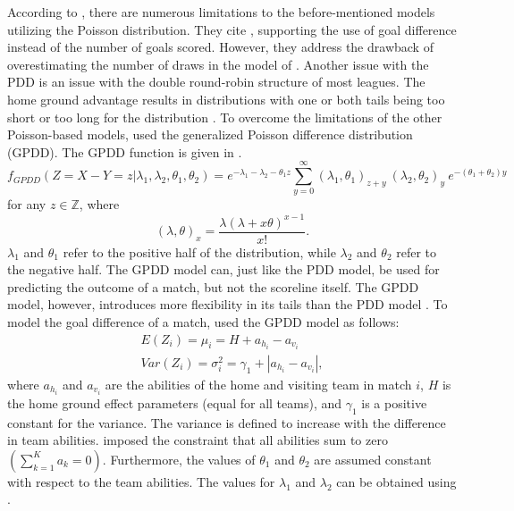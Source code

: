 According to \citet{bib:shahtahmassebi-moyeed-2016}, there are numerous limitations to the before-mentioned models utilizing the Poisson distribution. They cite \citet{bib:karlis-ntzoufras-2008}, supporting the use of goal difference instead of the number of goals scored. However, they address the drawback of overestimating the number of draws in the model of \citet{bib:karlis-ntzoufras-2008}. Another issue with the PDD is an issue with the double round-robin structure of most leagues. The home ground advantage results in distributions with one or both tails being too short or too long for the distribution \citep{bib:shahtahmassebi-moyeed-2016}. To overcome the limitations of the other Poisson-based models, \citet{bib:shahtahmassebi-moyeed-2016} used the generalized Poisson difference distribution (GPDD). The GPDD function is given in .
\begin{equation}
    f_{GPDD}(Z = X - Y = z | \lambda_{1}, \lambda_{2}, \theta_{1}, \theta_{2}) = e^{-\lambda_{1} - \lambda_{2} - \theta_{1} z} \sum_{y=0}^{\infty} (\lambda_{1}, \theta_{1})_{z + y}\ (\lambda_{2}, \theta_{2})_{y}\ e^{-(\theta_{1} + \theta_{2})y}
    \label{eq:gpdd-mass-function}
\end{equation}
for any $z \in \mathbb{Z}$, where
\begin{equation*}
    (\lambda, \theta)_{x} = \frac{\lambda(\lambda + x \theta)^{x - 1}}{x!}.
\end{equation*}
$\lambda_{1}$ and $\theta_{1}$ refer to the positive half of the distribution, while $\lambda_{2}$ and $\theta_{2}$ refer to the negative half. The GPDD model can, just like the PDD model, be used for predicting the outcome of a match, but not the scoreline itself. The GPDD model, however, introduces more flexibility in its tails than the PDD model \citep{bib:shahtahmassebi-moyeed-2016}. To model the goal difference of a match, \citet{bib:shahtahmassebi-moyeed-2016} used the GPDD model as follows:
\begin{equation*}
    \begin{aligned}
        E(Z_{i}) = \mu_{i} = H + a_{h_{i}} - a_{v_{i}} \\
        Var(Z_{i}) = \sigma_{i}^{2} = \gamma_{1} + | a_{h_{i}} - a_{v_{i}} |,
    \end{aligned}
\end{equation*}
where $a_{h_{i}}$ and $a_{v_{i}}$ are the abilities of the home and visiting team in match $i$, $H$ is the home ground effect parameters (equal for all teams), and $\gamma_{1}$ is a positive constant for the variance. The variance is defined to increase with the difference in team abilities. \citet{bib:shahtahmassebi-moyeed-2016} imposed the constraint that all abilities sum to zero $(\sum_{k=1}^{K} a_{k} = 0)$. Furthermore, the values of $\theta_{1}$ and $\theta_{2}$ are assumed constant with respect to the team abilities. The values for $\lambda_{1}$ and $\lambda_{2}$ can be obtained using .
